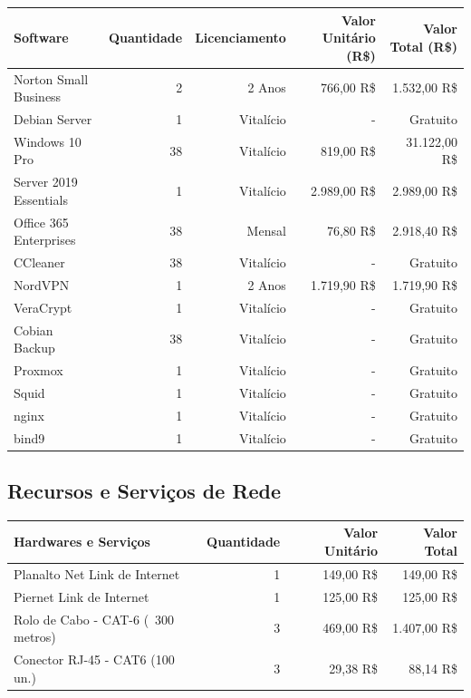 \documentclass[12pt]{article}
\begin{document}
\begin{center}
\begin{tabular}{| l | r | r | r | r |}
\hline 
Software & Quantidade & Licenciamento & Valor Unitário (R\$) & Valor Total (R\$)\\
\hline
Norton Small Business & 2 & 2 Anos & 766,00 R\$ & 1.532,00 R\$\\
Debian Server & 1 & Vitalício & - & Gratuito\\
Windows 10 Pro & 38 & Vitalício & 819,00 R\$ & 31.122,00 R\$\\
Server 2019 Essentials & 1 & Vitalício & 2.989,00 R\$ & 2.989,00 R\$\\
Office 365 Enterprises & 38 & Mensal & 76,80 R\$ & 2.918,40 R\$\\
CCleaner & 38 & Vitalício & - & Gratuito\\
NordVPN & 1 & 2 Anos & 1.719,90 R\$ & 1.719,90 R\$\\
VeraCrypt & 1 & Vitalício & - & Gratuito\\
Cobian Backup & 38 & Vitalício & - & Gratuito\\
Proxmox & 1 & Vitalício & - & Gratuito\\
Squid & 1 & Vitalício  & - & Gratuito\\
nginx & 1 & Vitalício & - & Gratuito\\
bind9 & 1 & Vitalício & - & Gratuito\\
\hline
\end{tabular}
\end{center}
\subsection{Recursos e Serviços de Rede}
\begin{center}
\begin{tabular}{| l | r | r | r |}
\hline
Hardwares e Serviços & Quantidade & Valor Unitário & Valor Total\\
\hline
Planalto Net Link de Internet & 1 & 149,00 R\$ & 149,00 R\$\\
Piernet Link de Internet & 1 & 125,00 R\$ & 125,00 R\$\\
Rolo de Cabo - CAT-6 (~300 metros) & 3 & 469,00 R\$ & 1.407,00 R\$\\
Conector RJ-45 - CAT6 (100 un.) & 3 & 29,38 R\$ & 88,14 R\$\\
\hline
\end{tabular}
\end{center}
\end{document}
